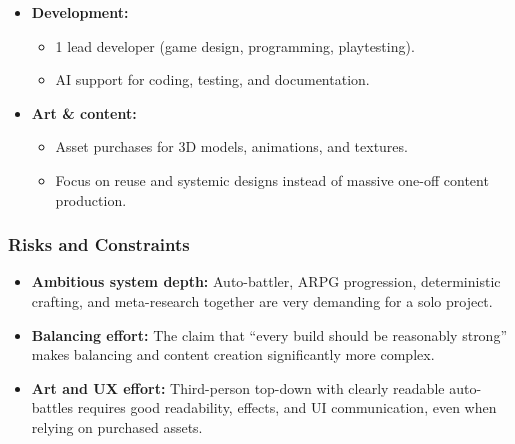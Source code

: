 \begin{itemize}
	\item \textbf{Development:} 
	\begin{itemize}
		\item 1 lead developer (game design, programming, playtesting).
		\item AI support for coding, testing, and documentation.
	\end{itemize}
	\item \textbf{Art \& content:}
	\begin{itemize}
		\item Asset purchases for 3D models, animations, and textures.
		\item Focus on reuse and systemic designs instead of massive one-off content production.
	\end{itemize}
\end{itemize}

\subsubsection*{Risks and Constraints}

\begin{itemize}
	\item \textbf{Ambitious system depth:} Auto-battler, ARPG progression, deterministic crafting, and meta-research together are very demanding for a solo project.
	\item \textbf{Balancing effort:} The claim that “every build should be reasonably strong” makes balancing and content creation significantly more complex.
	\item \textbf{Art and UX effort:} Third-person top-down with clearly readable auto-battles requires good readability, effects, and UI communication, even when relying on purchased assets.
\end{itemize}

